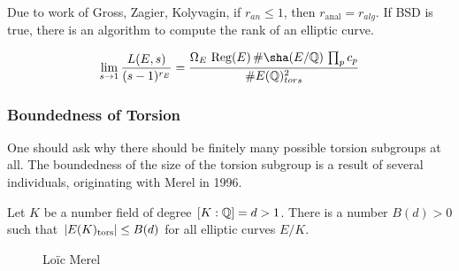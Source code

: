 \begin{frame}[plain]
Due to work of Gross, Zagier, Kolyvagin, if $r_{an} \leq 1$, then $r_{\text{anal}}=r_{alg}$.
If BSD is true, there is an algorithm to compute the rank of an elliptic curve. 

	\[
	\lim_{s \to 1} \dfrac{L(E,s)}{(s-1)^{r_E}} = \dfrac{\Omega_E \, \Reg(E) \, \#\sha(E/\Q) \, \prod_p c_p}{\#E(\Q)_{tors}^2}
	\]
\end{frame}



\begin{frame}[plain]
\end{frame}



\begin{frame}[plain] \frametitle{Boundedness of Torsion} \footnotesize
One should ask why there should be finitely many possible torsion subgroups at all. The boundedness of the size of the torsion subgroup is a result of several individuals, originating with Merel in 1996. 

\begin{thm}[Merel,1996]
Let $K$ be a number field of degree $[K:\mathbb{Q}]=d>1$. There is a number $B(d)>0$ such that $|E(K)_{\text{tors}}| \leq B(d)$ for all elliptic curves $E/K$.
\end{thm}
	\begin{figure}
	\captionsetup{labelformat=empty}
	\centering
	\caption{Lo\"ic Merel}
	\end{figure}
\end{frame}



